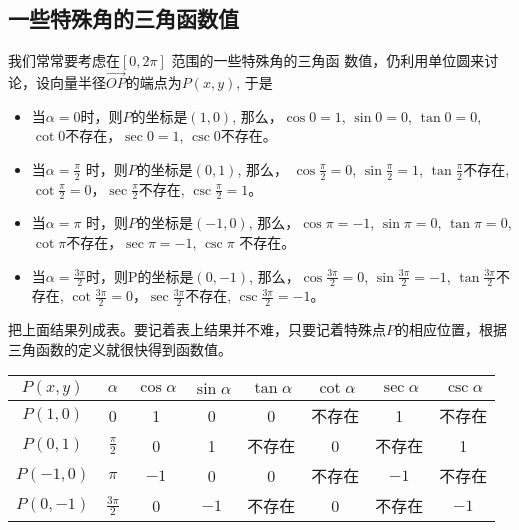 \subsection{一些特殊角的三角函数值}
我们常常要考虑在$[0,2\pi]$ 范围的一些特殊角的三角函
数值，仍利用单位圆来讨论，设向量半径$\Vec{OP}$的端点为$P(x,y)$, 于是
\begin{itemize}
    \item 当$\alpha =0$时，则$P$的坐标是$(1,0)$, 那么，$\cos0=1$, 
$\sin0=0$, $\tan0=0$, $\cot0$不存在，$\sec 0=1$, $\csc0$不存在。
\item 当$\alpha =\frac{\pi}{2}$
时，则$P$的坐标是$(0,1)$, 那么，
$\cos\frac{\pi}{2}=0$, 
$\sin\frac{\pi}{2}=1$, $\tan\frac{\pi}{2}$不存在, $\cot\frac{\pi}{2}=0$，$\sec \frac{\pi}{2}$不存在, $\csc\frac{\pi}{2}=1$。

\item 当$\alpha =\pi$ 时，则$P$的坐标是$(-1,0)$, 那么，$\cos\pi =-1$, $\sin\pi =0$, $\tan\pi =0$, $\cot\pi$不存在，$\sec \pi =-1$, $\csc\pi$ 不存在。
\item 当$\alpha=\frac{3\pi}{2}$时，则P的坐标是$(0,-1)$, 那么，$\cos\frac{3\pi}{2}=0$, 
$\sin\frac{3\pi}{2}=-1$, $\tan\frac{3\pi}{2}$不存在, $\cot\frac{3\pi}{2}=0$，$\sec \frac{3\pi}{2}$不存在, $\csc\frac{3\pi}{2}=-1$。
\end{itemize}

把上面结果列成表。要记着表上结果并不难，只要记着特殊点$P$的相应位置，根据三角函数的定义就很快得到函数值。
\begin{center}
\begin{tabular}{c|c|cccccc}
\hline
$P(x,y)$ & $\alpha$& $\cos\alpha$& $\sin\alpha$& $\tan\alpha$& $\cot\alpha$& $\sec\alpha$& $\csc\alpha$\\
\hline
$P(1,0)$  &0&1&0&0&不存在&1&不存在\\
$P(0,1)$ &$\frac{\pi}{2}$&0&1&不存在&0&不存在&1\\
$P(-1,0)$ &$\pi$&$-1$&0&0&不存在&$-1$&不存在\\
$P(0,-1)$ &$\frac{3\pi}{2}$&0&$-1$&不存在&0&不存在&$-1$\\
\hline
\end{tabular}
\end{center}

